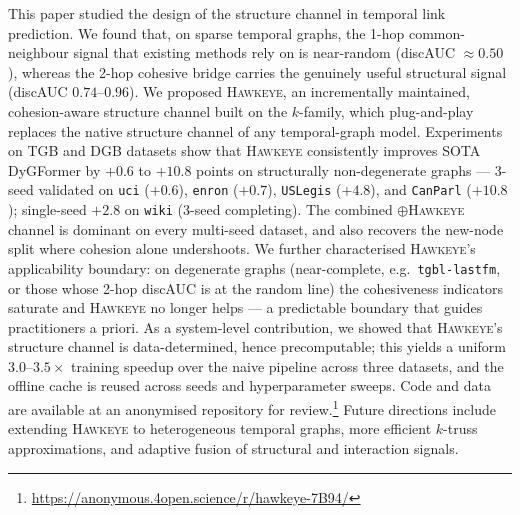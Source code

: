 \documentclass[sigconf,nonacm,review]{acmart}
\newcommand{\method}{\textsc{Hawkeye}\xspace}
\begin{document}
This paper studied the design of the structure channel in temporal link
prediction. We found that, on sparse temporal graphs, the 1-hop common-neighbour
signal that existing methods rely on is near-random (discAUC $\approx0.50$),
whereas the 2-hop cohesive bridge carries the genuinely useful structural signal
(discAUC $0.74$--$0.96$). We proposed \method, an incrementally maintained,
cohesion-aware structure channel built on the $k$-family, which plug-and-play
replaces the native structure channel of any temporal-graph model. Experiments
on TGB and DGB datasets show that \method consistently improves SOTA DyGFormer
by $+0.6$ to $+10.8$ points on structurally non-degenerate graphs --- 3-seed
validated on \texttt{uci} ($+0.6$), \texttt{enron} ($+0.7$),
\texttt{USLegis} ($+4.8$), and \texttt{CanParl} ($+10.8$); single-seed
$+2.8$ on \texttt{wiki} (3-seed completing). The combined $\oplus$\method
channel is dominant on every multi-seed dataset, and also recovers the
new-node split where cohesion alone undershoots. We further
characterised \method's applicability boundary: on degenerate graphs
(near-complete, e.g.\ \texttt{tgbl-lastfm}, or those whose 2-hop discAUC
is at the random line) the cohesiveness indicators saturate and \method
no longer helps --- a predictable boundary that guides practitioners
a priori. As a system-level contribution,
we showed that \method's structure channel is data-determined, hence
precomputable; this yields a uniform $3.0$--$3.5\times$ training speedup over
the naive pipeline across three datasets, and the offline cache is reused
across seeds and hyperparameter sweeps. Code and data are available at an
anonymised repository for review.\footnote{\url{https://anonymous.4open.science/r/hawkeye-7B94/}}
Future directions include extending \method to
heterogeneous temporal graphs, more efficient $k$-truss approximations, and
adaptive fusion of structural and interaction signals.




\end{document}
